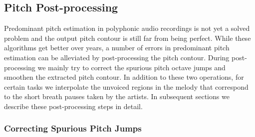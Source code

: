 {

\subsection{Pitch Post-processing}
\label{sec:data_preprocessing_pitch_postprocessing}

Predominant pitch estimation in polyphonic audio recordings is not yet a solved problem and the output pitch contour is still far from being perfect. While these algorithms get better over years, a number of errors in predominant pitch estimation can be alleviated by post-processing the pitch contour. During post-processing we mainly try to correct the spurious pitch octave jumps and smoothen the extracted pitch contour. In addition to these two operations, for certain tasks we interpolate the unvoiced regions in the melody that correspond to the short breath pauses taken by the artists. In subsequent sections we describe these post-processing steps in detail.


\subsubsection{Correcting Spurious Pitch Jumps}
\label{sec:data_processing_correcting_pitch_jumps}

}
